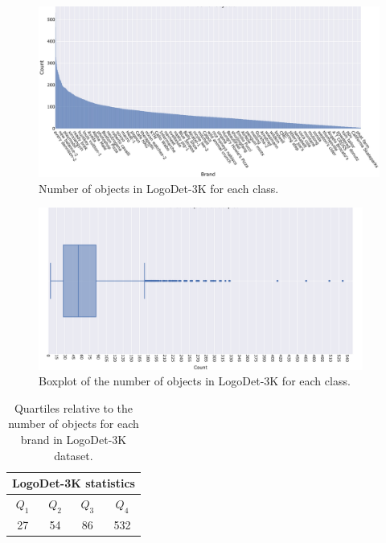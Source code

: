 \begin{figure}[ht]
	\centering

    \begin{center}
        \includegraphics[width=\textwidth]{images/freq.jpeg}
    \end{center}
	\caption{Number of objects in LogoDet-3K for each class.}%
	\label{fig:logodet-dist}%
\end{figure}


\begin{figure}[ht]
	\centering

    \begin{center}
        \includegraphics[width=0.95\textwidth]{images/box_plot.png}
    \end{center}
	\caption{Boxplot of the number of objects in LogoDet-3K for each class.}%
	\label{fig:logodet-boxplot}%
\end{figure}

\begin{table}[ht]
    \centering
    \begin{tabular}{c  c  c  c } 
     \hline
     \multicolumn{4}{c}{LogoDet-3K statistics}\\
     \hline
     \textbf{$Q_1$} & \textbf{$Q_2$} & \textbf{$Q_3$} & \textbf{$Q_4$} \\
     \hline
     27 & 54 & 86 & 532 \\
    \end{tabular}
    \caption{Quartiles relative to the number of objects for each brand in LogoDet-3K dataset.}
    \label{table:logodet3k-quartile}
\end{table}

